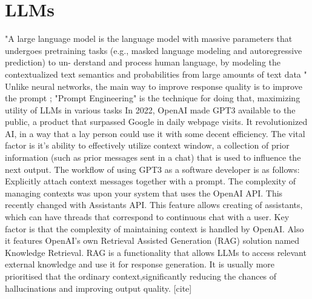 \section{LLMs}
"A large language model is the language model with massive
parameters that undergoes pretraining tasks (e.g., masked
language modeling and autoregressive prediction) to un-
derstand and process human language, by modeling the
contextualized text semantics and probabilities from large
amounts of text data " \cite{Yao2023ASO}
Unlike neural networks, the main way to improve response quality is to improve the prompt \cite{Liu2021PretrainPA}; "Prompt Engineering" is the technique for doing that, maximizing utility of LLMs in various tasks \cite{zhou2023large}
 In 2022, OpenAI made GPT3 available to the public, a product that surpassed Google in daily webpage visits. It revolutionized AI, in a way that a lay person could use it with some decent efficiency. The vital factor is it's ability to effectively utilize context window, a collection of prior information (such as prior messages sent in a chat) that is used to influence the next output. The workflow of using GPT3 as a software developer is as follows: Explicitly attach context messages together with a prompt. The complexity of managing contexts was upon your system that uses the OpenAI API. This recently changed with Assistants API. This feature allows creating of assistants, which can have threads that correspond to continuous chat with a user. Key factor is that the complexity of maintaining context is handled by OpenAI. Also it features OpenAI's own Retrieval Assisted Generation (RAG) solution named Knowledge Retrieval. RAG is a functionality that allows LLMs to access relevant external knowledge and use it for response generation. It is usually more prioritised that the ordinary context,significantly reducing the chances of hallucinations and improving output quality. [cite]

